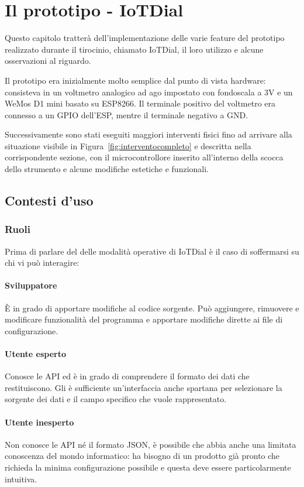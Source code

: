 \documentclass[12pt,a4paper]{report}
\begin{document}
\chapter{Il prototipo - IoTDial}
Questo capitolo tratterà dell'implementazione delle varie feature del prototipo realizzato durante il tirocinio, chiamato IoTDial,
il loro utilizzo e alcune osservazioni al riguardo.

Il prototipo era inizialmente molto semplice dal punto di vista hardware: consisteva in un voltmetro analogico ad ago impostato con
fondoscala a 3V e un WeMos D1 mini basato su ESP8266. Il terminale positivo del voltmetro era connesso a un GPIO dell'ESP,
mentre il terminale negativo a GND.

Successivamente sono stati eseguiti maggiori interventi fisici fino ad arrivare alla situazione visibile in Figura~\ref{fig:interventocompleto}
e descritta nella corrispondente sezione, con il microcontrollore inserito all'interno della scocca dello strumento e alcune modifiche estetiche
e funzionali.

\section{Contesti d'uso}
\subsection{Ruoli}
Prima di parlare del delle modalità operative di IoTDial è il caso di soffermarsi su chi vi può interagire:

\subsubsection*{Sviluppatore}
È in grado di apportare modifiche al codice sorgente. Può aggiungere, rimuovere e  modificare funzionalità del programma
e apportare modifiche dirette ai file di configurazione.
\subsubsection*{Utente esperto}
Conosce le API ed è in grado di comprendere il formato dei dati che restituiscono. Gli è sufficiente un'interfaccia anche spartana
per selezionare la sorgente dei dati e il campo specifico che vuole rappresentato.
\subsubsection*{Utente inesperto}
Non conosce le API né il formato JSON, è possibile che abbia anche una limitata conoscenza del mondo informatico:
ha bisogno di un prodotto già pronto che richieda la minima configurazione possibile e questa
deve essere particolarmente intuitiva. 
\end{document}
